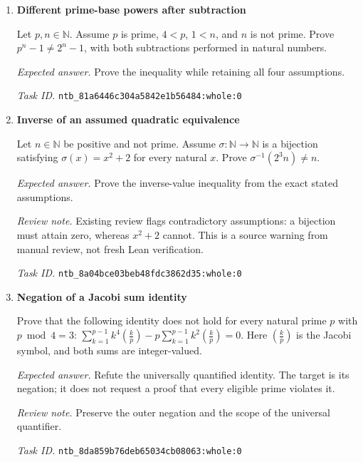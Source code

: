 \documentclass[11pt]{article}
\newcommand{\pth}[1]{\nolinkurl{#1}}
\begin{document}
\begin{enumerate}[label={TEST \arabic*.},leftmargin=4.5em,itemsep=1em]
\emph{Expected answer.} Prove the inequality of these two natural numbers.

\emph{Review note.} The division is natural-number division, not rational division.

\emph{Task ID.} \pth{ntb_819c891a3cb42e3ed8f8c31c:whole:0}

\item \textbf{Different prime-base powers after subtraction}\label{qn:test:47}

Let $p,n\in\mathbb N$. Assume $p$ is prime, $4<p$, $1<n$, and $n$ is not prime. Prove $p^n-1\ne2^n-1$, with both subtractions performed in natural numbers.

\emph{Expected answer.} Prove the inequality while retaining all four assumptions.

\emph{Task ID.} \pth{ntb_81a6446c304a5842e1b56484:whole:0}

\item \textbf{Inverse of an assumed quadratic equivalence}\label{qn:test:48}

Let $n\in\mathbb N$ be positive and not prime. Assume $\sigma:\mathbb N\to\mathbb N$ is a bijection satisfying $\sigma(x)=x^2+2$ for every natural $x$. Prove $\sigma^{-1}(2^3n)\ne n$.

\emph{Expected answer.} Prove the inverse-value inequality from the exact stated assumptions.

\emph{Review note.} Existing review flags contradictory assumptions: a bijection must attain zero, whereas $x^2+2$ cannot. This is a source warning from manual review, not fresh Lean verification.

\emph{Task ID.} \pth{ntb_8a04bce03beb48fdc3862d35:whole:0}

\item \textbf{Negation of a Jacobi sum identity}\label{qn:test:49}

Prove that the following identity does not hold for every natural prime $p$ with $p\bmod4=3$: $\sum_{k=1}^{p-1}k^4\left(\frac{k}{p}\right)-p\sum_{k=1}^{p-1}k^2\left(\frac{k}{p}\right)=0$. Here $\left(\frac{k}{p}\right)$ is the Jacobi symbol, and both sums are integer-valued.

\emph{Expected answer.} Refute the universally quantified identity. The target is its negation; it does not request a proof that every eligible prime violates it.

\emph{Review note.} Preserve the outer negation and the scope of the universal quantifier.

\emph{Task ID.} \pth{ntb_8da859b76deb65034cb08063:whole:0}


\end{enumerate}
\end{document}
